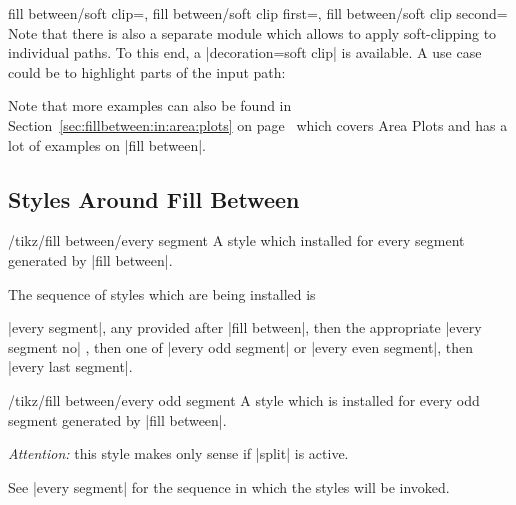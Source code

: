 \begin{tikzkeylist}{%
    fill between/soft clip=,
    fill between/soft clip first=,
    fill between/soft clip second=%
}
    Note that there is also a separate module which allows to apply
    soft-clipping to individual paths. To this end, a |decoration=soft clip| is
    available. A use case could be to highlight parts of the input path:
\begin{codeexample}[]
\end{codeexample}

    Note that more examples can also be found in
    Section~\ref{sec:fillbetween:in:area:plots} on
    page~\pageref{sec:fillbetween:in:area:plots} which covers Area Plots and
    has a lot of examples on |fill between|.
\end{tikzkeylist}


\subsection{Styles Around Fill Between}

\begin{stylekey}{/tikz/fill between/every segment}
    A style which installed for every segment generated by |fill between|.

    The sequence of styles which are being installed is

    |every segment|, any  provided after
    | fill between|, then the appropriate
    |every segment no| , then one of |every odd segment| or
    |every even segment|, then |every last segment|.
\end{stylekey}

\begin{stylekey}{/tikz/fill between/every odd segment}
    A style which is installed for every odd segment generated by
    |fill between|.

    \emph{Attention:} this style makes only sense if |split| is active.

    See |every segment| for the sequence in which the styles will be invoked.
\end{stylekey}

